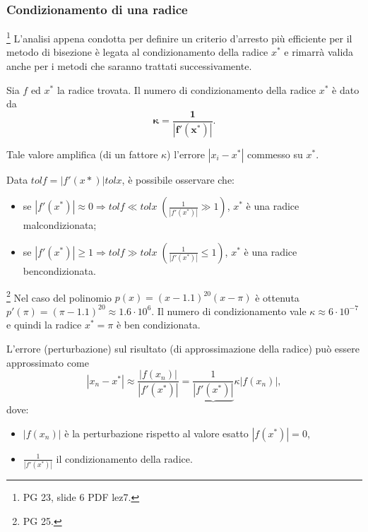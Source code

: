 \subsubsection{Condizionamento di una radice}\footnote{PG 23, slide 6 PDF lez7.} L'analisi appena condotta per definire un criterio d'arresto più efficiente per il metodo di bisezione è legata al condizionamento della radice $x^*$ e rimarrà valida anche per i metodi che saranno trattati successivamente.

\begin{definition}\label{def:numero_condizionamento_radice}
	Sia $f$ ed $x^*$ la radice trovata. Il numero di condizionamento della radice $x^*$ è dato da
	\begin{equation}\label{eq:defK}
		\boldsymbol{\kappa =\frac{1}{|f'(x^*)|}.}
	\end{equation}
\end{definition}
Tale valore amplifica (di un fattore $\kappa$) l'errore $|x_i-x^*|$ commesso su $x^*$.

\begin{remark}
	Data $tolf = |f'(x*)|tolx$, è possibile osservare che:
	\begin{itemize}
		\item se $|f'(x^*)|\approx 0\Rightarrow tolf\ll tolx\; \left(\frac{1}{|f'(x^*)|}\gg 1\right)$, $x^*$ è una radice malcondizionata;
		
		\item se $|f'(x^*)|\geq 1 \Rightarrow tolf\gg tolx\; \left(\frac{1}{|f'(x^*)|}\leq 1\right)$, $x^*$ è una radice bencondizionata.
	\end{itemize}
\end{remark}

\begin{example}\footnote{PG 25.}
	Nel caso del polinomio $p(x)=(x-1.1)^{20}(x-\pi)$ è ottenuta $p'(\pi)=(\pi-1.1)^{20}\approx 1.6\cdot 10^6$. Il numero di condizionamento vale $\kappa\approx 6\cdot 10^{-7}$ e quindi la radice $x^*=\pi$ è ben condizionata.
\end{example}

\begin{definition}
	L'errore (perturbazione) sul risultato (di approssimazione della radice) può essere approssimato come
	\begin{equation*}
		|x_n-x^*|\approx\frac{|f(x_n)|}{|f'(x^*)|}=\underbrace{\frac{1}{|f'(x^*)|}}{\kappa}|f(x_n)|,
	\end{equation*}
	dove:
	\begin{itemize}
		\item $|f(x_n)|$ è la perturbazione rispetto al valore esatto $|f(x^*)|=0$,
		\item  $\frac{1}{|f'(x^*)|}$ il condizionamento della radice.
	\end{itemize}
\end{definition}

